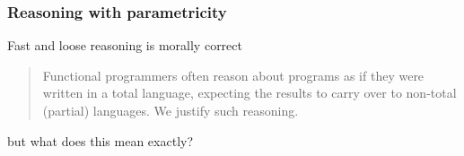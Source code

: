 \begin{frame}[fragile]
\frametitle{Reasoning with parametricity}
\begin{block}{Fast and loose reasoning is morally correct \cite{danielsson2006fast}}
\begin{quotation}
Functional programmers often reason about programs as if
they were written in a total language, expecting the results
to carry over to non-total (partial) languages. We justify
such reasoning.
\end{quotation}
\end{block}
but what does this mean exactly?
\end{frame}


